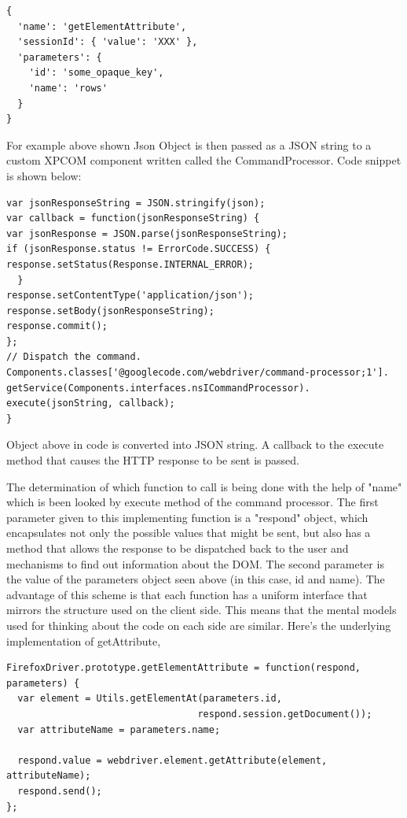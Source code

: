 \documentclass[article,type=msc,colorback,accentcolor=tud9c,twoside,11pt]{tudthesis}
\begin{document}
\begin{lstlisting}
{
  'name': 'getElementAttribute',
  'sessionId': { 'value': 'XXX' },
  'parameters': {
    'id': 'some_opaque_key',
    'name': 'rows'
  }
}
\end{lstlisting} 

 For example above shown Json Object is then passed as a JSON string to a custom XPCOM component written called the CommandProcessor. Code snippet is shown below:
\begin{lstlisting}
var jsonResponseString = JSON.stringify(json);
var callback = function(jsonResponseString) {
var jsonResponse = JSON.parse(jsonResponseString);
if (jsonResponse.status != ErrorCode.SUCCESS) {
response.setStatus(Response.INTERNAL_ERROR);
  }
response.setContentType('application/json');
response.setBody(jsonResponseString);
response.commit();
};
// Dispatch the command.
Components.classes['@googlecode.com/webdriver/command-processor;1'].
getService(Components.interfaces.nsICommandProcessor).
execute(jsonString, callback);
}
\end{lstlisting}
Object above in code is converted into JSON string. A callback to the execute method that causes the HTTP response to be sent is passed.

The determination of which function to call is being done with the help of "name" which is been looked by execute method of the command processor. The first parameter given to this implementing function is a "respond" object, which encapsulates not only the possible values that might be sent, but also has a method that allows the response to be dispatched back to the user and mechanisms to find out information about the DOM. The second parameter is the value of the parameters object seen above (in this case, id and name). The advantage of this scheme is that each function has a uniform interface that mirrors the structure used on the client side. This means that the mental models used for thinking about the code on each side are similar. Here's the underlying implementation of getAttribute,
 
 \begin{lstlisting}
FirefoxDriver.prototype.getElementAttribute = function(respond, parameters) {
  var element = Utils.getElementAt(parameters.id,
                                  respond.session.getDocument());
  var attributeName = parameters.name;

  respond.value = webdriver.element.getAttribute(element, attributeName);
  respond.send();
};
\end{lstlisting}
\end{document}
